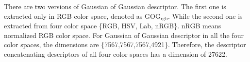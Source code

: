 \documentclass[10pt,twocolumn,letterpaper]{article}
\begin{document}
There are two versions of Gaussian of Gaussian descriptor. The first one is extracted only in RGB color space, denoted as GOG$_\text{rgb}$. While the second one is extracted from four color space \{RGB, HSV, Lab, nRGB\}. nRGB means normalized RGB color space. For Gaussian of Gaussian descriptor in all the four color spaces, the dimensions are \{7567,7567,7567,4921\}. Therefore, the descriptor concatenating descriptors of all four color spaces has a dimension of 27622.
\end{document}
